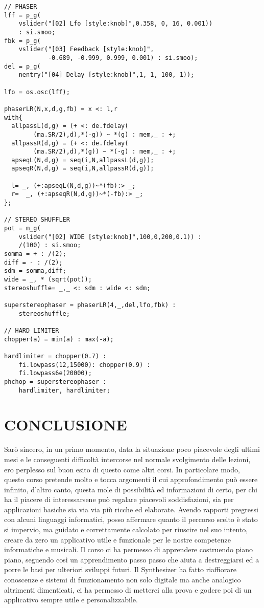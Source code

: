 \documentclass[
	a4paper,
	twocolumn
	]{article}
\begin{document}
\begin{lstlisting}
// PHASER
lff = p_g(
	vslider("[02] Lfo [style:knob]",0.358, 0, 16, 0.001))
	: si.smoo;
fbk = p_g(
	vslider("[03] Feedback [style:knob]",
	        -0.689, -0.999, 0.999, 0.001) : si.smoo);
del = p_g(
	nentry("[04] Delay [style:knob]",1, 1, 100, 1));

lfo = os.osc(lff);

phaserLR(N,x,d,g,fb) = x <: l,r
with{
  allpassL(d,g) = (+ <: de.fdelay(
		(ma.SR/2),d),*(-g)) ~ *(g) : mem,_ : +;
  allpassR(d,g) = (+ <: de.fdelay(
		(ma.SR/2),d),*(g)) ~ *(-g) : mem,_ : +;
  apseqL(N,d,g) = seq(i,N,allpassL(d,g));
  apseqR(N,d,g) = seq(i,N,allpassR(d,g));

  l= _, (+:apseqL(N,d,g))~*(fb):> _;
  r=  _, (+:apseqR(N,d,g))~*(-fb):> _;
};

// STEREO SHUFFLER
pot = m_g(
	vslider("[02] WIDE [style:knob]",100,0,200,0.1)) :
	/(100) : si.smoo;
somma = + : /(2);
diff = - : /(2);
sdm = somma,diff;
wide = _, * (sqrt(pot));
stereoshuffle= _,_ <: sdm : wide <: sdm;

superstereophaser = phaserLR(4,_,del,lfo,fbk) :
	stereoshuffle;

// HARD LIMITER
chopper(a) = min(a) : max(-a);

hardlimiter = chopper(0.7) :
	fi.lowpass(12,15000): chopper(0.9) :
	fi.lowpass6e(20000);
phchop = superstereophaser :
	hardlimiter, hardlimiter;
 \end{lstlisting}

\section*{CONCLUSIONE}

Sarò sincero, in un primo momento, data la situazione poco piacevole degli ultimi mesi e le conseguenti difficoltà intercorse nel normale svolgimento delle lezioni, ero perplesso sul buon esito di questo come altri corsi.  In particolare modo,  questo corso pretende molto e tocca argomenti il cui approfondimento può essere infinito, d’altro canto, questa mole di possibilità ed informazioni di certo, per chi ha il piacere di interessarsene può regalare piacevoli soddisfazioni,  sia per applicazioni basiche sia via via più ricche ed elaborate. Avendo rapporti pregressi con alcuni linguaggi informatici, posso affermare quanto il percorso scelto è stato si impervio, ma guidato e correttamente calcolato per riuscire nel suo intento, creare da zero un applicativo utile e funzionale per le nostre competenze informatiche e musicali. Il corso ci ha permesso di apprendere costruendo piano piano, seguendo così un apprendimento passo passo che aiuta a destreggiarsi ed a porre le basi per ulteriori sviluppi futuri. Il Synthesizer ha fatto riaffiorare conoscenze e sistemi di funzionamento non solo digitale ma anche analogico altrimenti dimenticati, ci ha permesso di metterci alla prova e godere poi di un applicativo sempre utile e personalizzabile.
\end{document}
